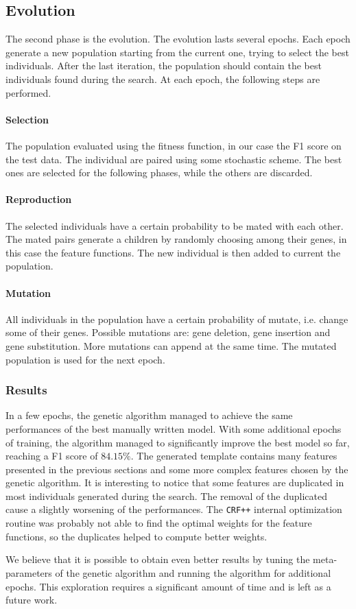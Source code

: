 \subsection{Evolution}
The second phase is the evolution.
The evolution lasts several epochs.
Each epoch generate a new population starting from the current one, trying to select the best individuals.
After the last iteration, the population should contain the best individuals found during the search.
At each epoch, the following steps are performed.

\paragraph{Selection}
The population evaluated using the fitness function, in our case the F1 score on the test data.
The individual are paired using some stochastic scheme.
The best ones are selected for the following phases, while the others are discarded.

\paragraph{Reproduction}
The selected individuals have a certain probability to be mated with each other.
The mated pairs generate a children by randomly choosing among their genes, in this case the feature functions.
The new individual is then added to current the population.

\paragraph{Mutation}
All individuals in the population have a certain probability of mutate, i.e. change some of their genes.
Possible mutations are: gene deletion, gene insertion and gene substitution.
More mutations can append at the same time.
The mutated population is used for the next epoch.

\subsubsection{Results}
In a few epochs, the genetic algorithm managed to achieve the same performances of the best manually written model.
With some additional epochs of training, the algorithm managed to significantly improve the best model so far, reaching a F1 score of $84.15\%$.
The generated template contains many features presented in the previous sections and some more complex features chosen by the genetic algorithm.
It is interesting to notice that some features are duplicated in most individuals generated during the search.
The removal of the duplicated cause a slightly worsening of the performances.
The \texttt{CRF++} internal optimization routine was probably not able to find the optimal weights for the feature functions, so the duplicates helped to compute better weights.

We believe that it is possible to obtain even better results by tuning the meta-parameters of the genetic algorithm and running the algorithm for additional epochs.
This exploration requires a significant amount of time and is left as a future work.
